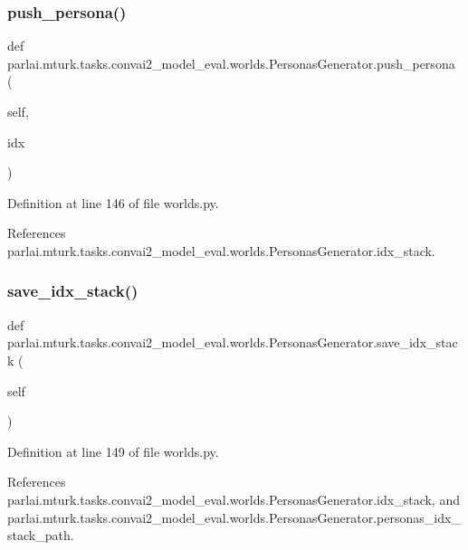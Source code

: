\subsubsection{\texorpdfstring{push\+\_\+persona()}{push\_persona()}}
{\footnotesize\ttfamily def parlai.\+mturk.\+tasks.\+convai2\+\_\+model\+\_\+eval.\+worlds.\+Personas\+Generator.\+push\+\_\+persona (\begin{DoxyParamCaption}\item[{}]{self,  }\item[{}]{idx }\end{DoxyParamCaption})}



Definition at line 146 of file worlds.\+py.



References parlai.\+mturk.\+tasks.\+convai2\+\_\+model\+\_\+eval.\+worlds.\+Personas\+Generator.\+idx\+\_\+stack.

\mbox{\label{classparlai_1_1mturk_1_1tasks_1_1convai2__model__eval_1_1worlds_1_1PersonasGenerator_a73147a14066f719d65b627877cfa13f6}} 
\subsubsection{\texorpdfstring{save\+\_\+idx\+\_\+stack()}{save\_idx\_stack()}}
{\footnotesize\ttfamily def parlai.\+mturk.\+tasks.\+convai2\+\_\+model\+\_\+eval.\+worlds.\+Personas\+Generator.\+save\+\_\+idx\+\_\+stack (\begin{DoxyParamCaption}\item[{}]{self }\end{DoxyParamCaption})}



Definition at line 149 of file worlds.\+py.



References parlai.\+mturk.\+tasks.\+convai2\+\_\+model\+\_\+eval.\+worlds.\+Personas\+Generator.\+idx\+\_\+stack, and parlai.\+mturk.\+tasks.\+convai2\+\_\+model\+\_\+eval.\+worlds.\+Personas\+Generator.\+personas\+\_\+idx\+\_\+stack\+\_\+path.



